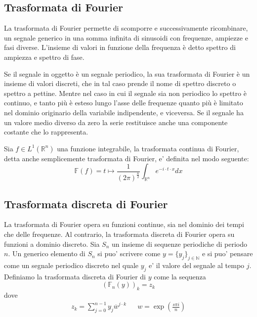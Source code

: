 \cite{fourier2}

\subsection{Trasformata di Fourier}

La trasformata di Fourier permette di scomporre e successivamente ricombinare, un segnale generico in una somma infinita di sinusoidi con frequenze, ampiezze e fasi diverse. L'insieme di valori in funzione della frequenza \`e detto spettro di ampiezza e spettro di fase. 

Se il segnale in oggetto \`e un segnale periodico, la sua trasformata di Fourier \`e un insieme di valori discreti, che in tal caso prende il nome di spettro discreto o spettro a pettine. 
Mentre nel caso in cui il segnale sia non periodico lo spettro \`e continuo, e tanto pi\`u \`e esteso lungo l'asse delle frequenze quanto pi\`u \`e limitato nel dominio originario della variabile indipendente, e viceversa.
Se il segnale ha un valore medio diverso da zero la serie restituisce anche una componente costante che lo rappresenta.

Sia $f\in L^{1}(\mathbb{R}^{n})$ una funzione integrabile, la trasformata continua di Fourier, detta anche semplicemente trasformata di Fourier, e' definita nel modo seguente:
\[
  \mathbb{F}(f)=  t\mapsto \frac{1}{(2\pi)^{\frac{n}{2}}} \int_{\mathbb{R}^{n}} e ^{-i\cdot t \cdot x} dx
\]

\cite{fourier}\cite{fourier3}

\subsection{Trasformata discreta di Fourier}

La trasformata di Fourier opera su funzioni continue, sia nel dominio dei tempi che delle frequenze. Al contrario, la trasformata discreta di Fourier opera su funzioni a dominio discreto. Sia $S_{n}$ un insieme di sequenze periodiche di periodo $n$. Un generico elemento di $S_{n}$ si puo' scrivere come $y=\{y_{j}\}_{j\in \mathbb{N}}$ e si puo' pensare come un segnale periodico discreto nel quale $y_{j}$ e' il valore del segnale al tempo $j$. Definiamo la trasformata discreta di Fourier di $y$ come la sequenza
\[
  (\mathbb{F}_{n}(y))_{k} = z_{k}
\]
dove
\[
  \begin{array}{lll}
      z_{k}=\displaystyle\sum_{j=0}^{n-1} y_{j} \overline{w}^{j \cdot k}
    &
    &
      w=\exp\left(\displaystyle\frac{s \pi i}{n}\right)
  \end{array}
\]
 
\cite{fourier}